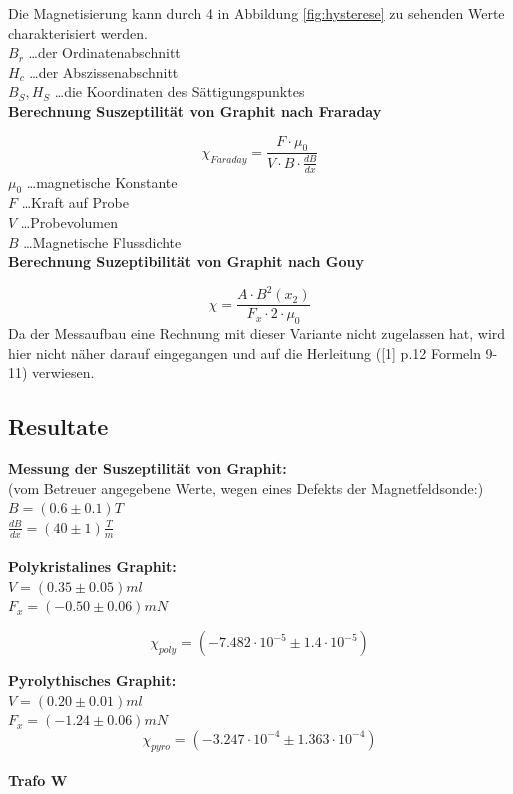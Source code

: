 \documentclass[12pt,a4paper]{article}
\begin{document}
\begin{multicols}{2}
\noindent
Die Magnetisierung kann durch 4 in Abbildung \ref{fig:hysterese} zu sehenden Werte charakterisiert werden.\\
$B_r$ \ldots der Ordinatenabschnitt\\
$H_c$ \ldots der Abszissenabschnitt\\
$B_S, H_S$ \ldots die Koordinaten des Sättigungspunktes\\


\textbf{Berechnung Suszeptilität von Graphit nach Fraraday}

$$\chi_{Faraday} = \frac{F \cdot \mu_0}{V \cdot B \cdot \frac{dB}{dx}}$$
$\mu_0$ \ldots magnetische Konstante\\
$F$ \ldots Kraft auf Probe\\
$V$ \ldots Probevolumen\\
$B$ \ldots Magnetische Flussdichte\\

\noindent
\textbf{Berechnung Suzeptibilität von Graphit nach Gouy}

$$\chi = \frac{A \cdot B^2(x_2)}{F_x \cdot 2 \cdot \mu_{0}} $$
Da der Messaufbau eine Rechnung mit dieser Variante nicht zugelassen hat, wird hier nicht näher darauf eingegangen und auf die Herleitung ([1] p.12 Formeln 9-11) verwiesen.

\subsection{Resultate}
\textbf{Messung der Suszeptilität von Graphit:}\\
(vom Betreuer angegebene Werte, wegen eines Defekts der Magnetfeldsonde:)\\
$B = (0.6 \pm 0.1)T$\\
$\frac{dB}{dx} = (40 \pm 1) \frac{T}{m}$\\
\\
\textbf{Polykristalines Graphit:}\\
$V=(0.35 \pm 0.05) ml$\\
$F_x=(-0.50 \pm 0.06)mN$

$$\chi_{poly} = (-7.482 \cdot 10^{-5} \pm 1.4 \cdot 10^{-5})$$

\textbf{Pyrolythisches Graphit:}\\
$V=(0.20 \pm 0.01) ml$\\
$F_x=(-1.24 \pm 0.06)mN$
$$\chi_{pyro} = (-3.247 \cdot 10^{-4} \pm 1.363 \cdot 10^{-4})$$
\\
\noindent
\textbf{Trafo W}\\

\end{multicols}
\end{document}
